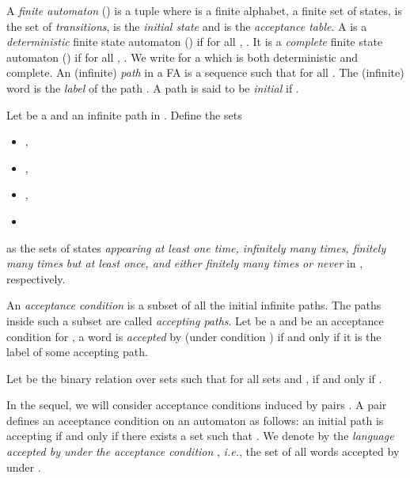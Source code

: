 \documentclass[preprint]{elsarticle}
\makeatletter
\newcommand{\ie}{\emph{i.e.}\@\xspace}
\makeatother
\begin{document}
A \emph{finite automaton} () is a tuple  where  is a finite alphabet,  a finite set of states,  is the set of \emph{transitions},  is the \emph{initial state} and  is the \emph{acceptance table}. A  is a \emph{deterministic} finite state automaton () if  for all , . It is a \emph{complete} finite state automaton () if  for all , . We write  for a  which is both deterministic and complete. 
An (infinite) \emph{path} in a FA  is a sequence  such that  for all . The (infinite) word  is the \emph{label} of the path . A path is said to be \emph{initial} if .
\begin{definition}
Let  be a  and  an infinite path in . Define the sets
\begin{itemize}
\item
,
\item
,
\item
,
\item

\end{itemize}
as the sets of states \emph{appearing at least one time, infinitely many times,  finitely many times but at least once, and either finitely many times or never} in , respectively. 
\end{definition}

An \emph{acceptance condition} is a subset of all the initial infinite paths. The paths inside such a subset are called \emph{accepting paths}. Let  be a  and  be an acceptance condition for , a word  is \emph{accepted} by  (under condition ) if and only if it is the label of some accepting path.

Let  be the binary relation over sets such that for all sets  and ,  if and only if . 

In the sequel, we will consider acceptance conditions induced by pairs . A pair  defines an acceptance condition  on an automaton  as follows: an initial path  is  accepting if and only if there exists a set  such that  . We denote by  the \emph{language accepted by  under the acceptance condition }, \ie, the set of all words accepted by  under .
\end{document}
